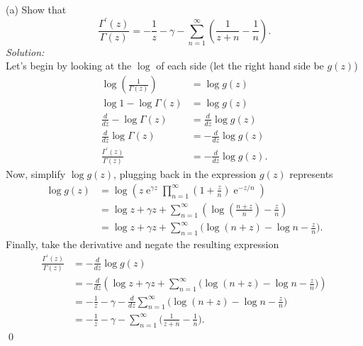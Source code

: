 \documentclass[10pt]{amsart}
\DeclareMathOperator{\E}{e}
\theoremstyle{nonumberplain}
\begin{document}
\begin{enumerate}[label={\bf {\arabic*}:}]
\noindent
(a) Show that 
$$
\frac {\Gamma^\prime(z)}{\Gamma(z)} = - \frac 1 z - \gamma - \sum_{n = 1}^\infty \left( \frac 1 {z + n} - \frac 1 n\right).
$$
\textit{Solution:} \\
Let's begin by looking at the $\log$ of each side (let the right hand side be $g(z)$)
\begin{align*}
\log \left( \frac 1 {\Gamma(z)} \right) &= \log g(z) \\
\log 1 - \log \Gamma(z)  &= \log g(z) \\
\frac d {d z} - \log\Gamma(z) &= \frac d {dz} \log g(z) \\
\frac d {d z} \log \Gamma(z) &=  - \frac d {dz} \log g(z) \\
\frac {\Gamma^\prime(z)}{\Gamma(z)} &=  - \frac d {dz} \log g(z).
\end{align*}
Now, simplify $\log g(z)$, plugging back in the expression $g(z)$ represents
\begin{align*}
\log g(z) &= \log \left( z \E^{\gamma z} \prod_{n=1}^\infty \left( 1 + \frac z n \right) \E^{-z / n} \right) \\
	&= \log z + \gamma z + \sum_{n=1}^\infty \left( \log \left(  \frac {n + z} n \right)  - \frac z  n \right) \\
	&= \log z + \gamma z + \sum_{n=1}^\infty \bigg( \log (n + z) - \log n  - \frac z  n \bigg).
\end{align*}
Finally, take the derivative and negate the resulting expression
\begin{align*}
\frac {\Gamma^\prime(z)}{\Gamma(z)} &= - \frac d {dz} \log g(z) \\
	&= - \frac d {dz}\left( \log z + \gamma z + \sum_{n=1}^\infty \bigg( \log (n + z) - \log n  - \frac z  n \bigg) \right) \\
	&= - \frac 1 z - \gamma - \frac d {dz}\sum_{n=1}^\infty \bigg( \log (n + z) - \log n  - \frac z  n \bigg) \\
	&= - \frac 1 z - \gamma - \sum_{n=1}^\infty \bigg( \frac 1 {z + n} - \frac 1 n \bigg).
\end{align*}
\qed \\


\end{enumerate}
\end{document}
